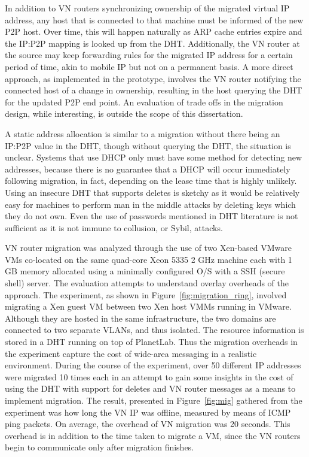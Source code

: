 In addition to VN routers synchronizing ownership of the migrated virtual IP
address, any host that is connected to that machine must be informed of the new
P2P host.  Over time, this will happen naturally as ARP cache entries expire
and the IP:P2P mapping is looked up from the DHT.  Additionally, the VN router
at the source may keep forwarding rules for the migrated IP address for a
certain period of time, akin to mobile IP but not on a permanent basis.  A more
direct approach, as implemented in the prototype, involves the VN router
notifying the connected host of a change in ownership, resulting in the host
querying the DHT for the updated P2P end point.  An evaluation of trade offs in
the migration design, while interesting, is outside the scope of this
dissertation. 

A static address allocation is similar to a migration without there being an
IP:P2P value in the DHT, though without querying the DHT, the situation is
unclear.  Systems that use DHCP only must have some method for detecting new
addresses, because there is no guarantee that a DHCP will occur immediately
following migration, in fact, depending on the lease time that is highly
unlikely.  Using an insecure DHT that supports deletes is sketchy as it would
be relatively easy for machines to perform man in the middle attacks by
deleting keys which they do not own.  Even the use of passwords mentioned in
DHT literature is not sufficient as it is not immune to collusion, or Sybil,
attacks.

VN router migration was analyzed through the use of two Xen-based VMware VMs
co-located on the same quad-core Xeon 5335 2 GHz machine each with 1 GB memory
allocated using a minimally configured O/S with a SSH (secure shell) server.
The evaluation attempts to understand overlay overheads of the approach.  The
experiment, as shown in Figure~\ref{fig:migration_ring}, involved migrating a
Xen guest VM between two Xen host VMMs running in VMware.  Although they are
hosted in the same infrastructure, the two domains are connected to two
separate VLANs, and thus isolated.  The resource information is stored in a DHT
running on top of PlanetLab.  Thus the migration overheads in the experiment
capture the cost of wide-area messaging in a realistic environment.  During the
course of the experiment, over 50 different IP addresses were migrated 10 times
each in an attempt to gain some insights in the cost of using the DHT with
support for deletes and VN router messages as a means to implement migration.
The result, presented in Figure~\ref{fig:mig} gathered from the experiment was
how long the VN IP was offline, measured by means of ICMP ping packets.  On
average, the overhead of VN migration was 20 seconds. This overhead is in
addition to the time taken to migrate a VM, since the VN routers begin to
communicate only after migration finishes. 


